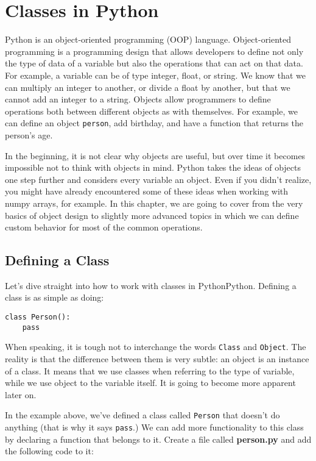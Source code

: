 \chapter{Classes in Python}\label{ch:classes-in-python}
Python is an object-oriented programming (OOP) language. Object-oriented programming is a programming design that allows developers to define not only the type of data of a variable but also the operations that can act on that data. For example, a variable can be of type integer, float, or string. We know that we can multiply an integer to another, or divide a float by another, but that we cannot add an integer to a string. Objects allow programmers to define operations both between different objects as with themselves. For example, we can define an object \texttt{person}, add birthday, and have a function that returns the person's age.

In the beginning, it is not clear why objects are useful, but over time it becomes impossible not to think with objects in mind. Python takes the ideas of objects one step further and considers every variable an object. Even if you didn't realize, you might have already encountered some of these ideas when working with numpy arrays, for example. In this chapter, we are going to cover from the very basics of object design to slightly more advanced topics in which we can define custom behavior for most of the common operations.

\section{Defining a Class}\label{sec:defining-a-class}
Let's dive straight into how to work with classes in PythonPython. Defining a class is as simple as doing:

\begin{verbatim}
class Person():
    pass
\end{verbatim}

When speaking, it is tough not to interchange the words \texttt{Class} and \texttt{Object}. The reality is that the difference between them is very subtle: an object is an instance of a class. It means that we use classes when referring to the type of variable, while we use object to the variable itself. It is going to become more apparent later on.

In the example above, we've defined a class called \texttt{Person} that doesn't do anything (that is why it says \texttt{pass}.) We can add more functionality to this class by declaring a function that belongs to it. Create a file called \textbf{person.py} and add the following code to it:

